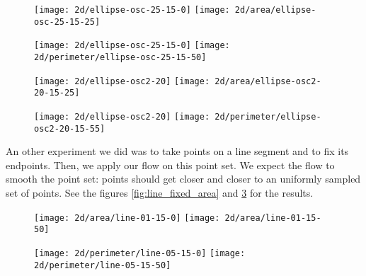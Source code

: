 \begin{figure}[h]
    \centering

    \texttt{[image: 2d/ellipse-osc-25-15-0]}
    \texttt{[image: 2d/area/ellipse-osc-25-15-25]}
    \label{fig:ellipse_osc_area_flow}

    \texttt{[image: 2d/ellipse-osc-25-15-0]}
    \texttt{[image: 2d/perimeter/ellipse-osc-25-15-50]}
    \label{fig:ellipse_osc_perimeter_flow}
\end{figure}

\begin{figure}[h]
    \centering

    \texttt{[image: 2d/ellipse-osc2-20]}
    \texttt{[image: 2d/area/ellipse-osc2-20-15-25]}
    \label{fig:ellipse_osc2_area_flow}

    \texttt{[image: 2d/ellipse-osc2-20]}
    \texttt{[image: 2d/perimeter/ellipse-osc2-20-15-55]}
    \label{fig:ellipse_osc2_perimeter_flow}
\end{figure}


An other experiment we did was to take points on a line segment and to fix its
endpoints. Then, we apply our flow on this point set. We expect the flow to
smooth the point set: points should get closer and closer to an uniformly
sampled set of points. See the figures \ref{fig:line_fixed_area} and
\ref{fig:line_fixed_perimeter} for the results.

\begin{figure}[h]
    \centering

    \texttt{[image: 2d/area/line-01-15-0]}
    \texttt{[image: 2d/area/line-01-15-50]}
    \label{fig:line_fixed_area}

    \texttt{[image: 2d/perimeter/line-05-15-0]}
    \texttt{[image: 2d/perimeter/line-05-15-50]}
    \label{fig:line_fixed_perimeter}
\end{figure}

